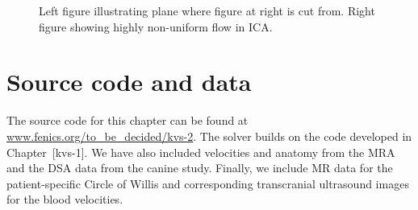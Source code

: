 \begin{figure}
  \begin{center}
    \caption{Left figure illustrating plane where figure at right is
      cut from. Right figure showing highly non-uniform flow in ICA.}
    \label{fig:cok_ica}
  \end{center}
\end{figure}

\section*{Source code and data}

The source code for this chapter can be found at
\url{www.fenics.org/to_be_decided/kvs-2}. The solver builds on the
code developed in Chapter~[kvs-1]. We have also included velocities
and anatomy from the MRA and the DSA data from the canine
study. Finally, we include MR data for the patient-specific Circle of
Willis and corresponding transcranial ultrasound images for the blood
velocities.
